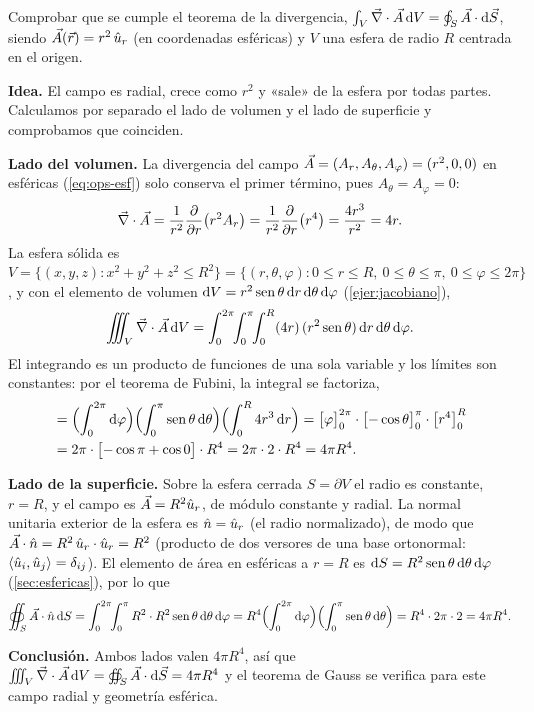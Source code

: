 \begin{ejercicio}\label{ejer:gauss-esfera}
Comprobar que se cumple el teorema de la divergencia,
$\int_V\vec{\nabla}\cdot\vec{A}\,\mathrm{d} V=\oint_S\vec{A}\cdot\mathrm{d}\vec{S}$, siendo $\vec{A}(\vec{r})=r^{2}\,\hat{u}_{r}$
(en coordenadas esféricas) y $V$ una esfera de radio $R$ centrada en el origen.
\end{ejercicio}
\begin{resolucion}
\textbf{Idea.} El campo es radial, crece como $r^{2}$ y «sale» de la esfera por
todas partes. Calculamos por separado el lado de volumen y el lado de superficie
y comprobamos que coinciden.

\textbf{Lado del volumen.} La divergencia del campo $\vec{A}=(A_r,A_\theta,A_\varphi)=(r^{2},0,0)$ en esféricas
(\cref{eq:ops-esf}) solo conserva el primer término, pues $A_\theta=A_\varphi=0$:
\[
  \vec{\nabla}\cdot\vec{A}=\frac{1}{r^{2}}\frac{\partial }{\partial r}\bigl(r^{2}A_r\bigr)=\frac{1}{r^{2}}\frac{\partial }{\partial r}\bigl(r^{4}\bigr)=\frac{4r^{3}}{r^{2}}=4r .
\]
La esfera sólida es
$V=\{(x,y,z):x^{2}+y^{2}+z^{2}\le R^{2}\}=\{(r,\theta,\varphi):0\le r\le R,\ 0\le\theta\le\pi,\ 0\le\varphi\le2\pi\}$,
y con el elemento de volumen $\mathrm{d} V=r^{2}\operatorname{sen}\theta\,\mathrm{d} r\,\mathrm{d}\theta\,\mathrm{d}\varphi$
(\cref{ejer:jacobiano}),
\[
  \iiint_V\vec{\nabla}\cdot\vec{A}\,\mathrm{d} V=\int_{0}^{2\pi}\!\!\int_{0}^{\pi}\!\!\int_{0}^{R}(4r)\,(r^{2}\operatorname{sen}\theta)\,\mathrm{d} r\,\mathrm{d}\theta\,\mathrm{d}\varphi .
\]
El integrando es un producto de funciones de una sola variable y los límites son
constantes: por el teorema de Fubini, la integral se factoriza,
\begin{align*}
  &=\Bigl(\int_0^{2\pi}\mathrm{d}\varphi\Bigr)\Bigl(\int_0^{\pi}\operatorname{sen}\theta\,\mathrm{d}\theta\Bigr)\Bigl(\int_0^{R}4r^{3}\,\mathrm{d} r\Bigr)
  =\bigl[\varphi\bigr]_0^{2\pi}\cdot\bigl[-\cos\theta\bigr]_0^{\pi}\cdot\bigl[r^{4}\bigr]_0^{R}\\
  &=2\pi\cdot\bigl[-\cos\pi+\cos0\bigr]\cdot R^{4}=2\pi\cdot2\cdot R^{4}=4\pi R^{4}.
\end{align*}

\textbf{Lado de la superficie.} Sobre la esfera cerrada $S=\partial V$ el radio es
constante, $r=R$, y el campo es $\vec{A}=R^{2}\hat{u}_{r}$, de módulo constante y radial. La
normal unitaria exterior de la esfera es $\hat{n}=\hat{u}_{r}$ (el radio normalizado), de modo
que $\vec{A}\cdot\hat{n}=R^{2}\,\hat{u}_{r}\cdot\hat{u}_{r}=R^{2}$ (producto de dos versores de una base
ortonormal: $\langle\hat{u}_{i},\hat{u}_{j}\rangle=\delta_{ij}$). El elemento de área en esféricas a $r=R$ es
$\mathrm{d} S=R^{2}\operatorname{sen}\theta\,\mathrm{d}\theta\,\mathrm{d}\varphi$ (\cref{sec:esfericas}), por lo que
\[
  \oiint_S\vec{A}\cdot\hat{n}\,\mathrm{d} S=\int_0^{2\pi}\!\!\int_0^{\pi}R^{2}\cdot R^{2}\operatorname{sen}\theta\,\mathrm{d}\theta\,\mathrm{d}\varphi
  =R^{4}\Bigl(\int_0^{2\pi}\mathrm{d}\varphi\Bigr)\Bigl(\int_0^{\pi}\operatorname{sen}\theta\,\mathrm{d}\theta\Bigr)
  =R^{4}\cdot2\pi\cdot2=4\pi R^{4}.
\]

\textbf{Conclusión.} Ambos lados valen $4\pi R^{4}$, así que
$\iiint_V\vec{\nabla}\cdot\vec{A}\,\mathrm{d} V=\oiint_S\vec{A}\cdot\mathrm{d}\vec{S}=4\pi R^{4}$ y el teorema de Gauss se
verifica para este campo radial y geometría esférica.
\end{resolucion}

